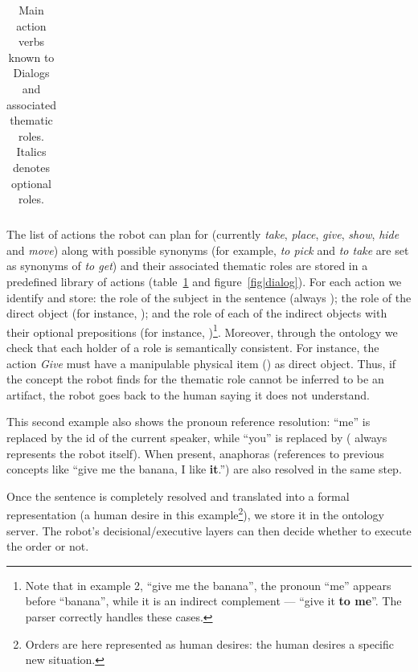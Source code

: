 \begin{table}
\begin{center}
\begin{tabular}{lllll}
\bottomrule

\end{tabular}
\end{center}
\caption{Main action verbs known to {\sc Dialogs} and associated thematic
roles. Italics denotes optional roles.}
\label{table|thematic-roles}
\end{table}

The list of actions the robot can plan for (currently \emph{take},
\emph{place}, \emph{give}, \emph{show}, \emph{hide} and \emph{move}) along with
possible synonyms (for example, \emph{to pick} and \emph{to take} are set as synonyms of \emph{to
get}) and their associated thematic roles are stored in a predefined library
of actions (table~\ref{table|thematic-roles} and figure~\ref{fig|dialog}).
For each action we identify and store: the role of the subject in
the sentence (always ); the role of the direct object (for
instance, ); and the role of each of the indirect objects
with their optional prepositions (for instance,
)\footnote{Note that in example 2, ``give me the banana'',
the pronoun ``me'' appears before ``banana'', while it is an indirect
complement --- ``give it {\bf to me}''. The parser correctly handles these
cases.}. Moreover, through the ontology we check that each holder of a role is
semantically consistent. For instance, the action \emph{Give} must have a
manipulable physical item () as direct object. Thus, if the
concept the robot finds for the thematic role  cannot be
inferred to be an artifact, the robot goes back to the human saying it does not
understand.

This second example  also shows the pronoun reference resolution: ``me'' is
replaced by the id of the current speaker, while ``you'' is replaced by
 ( always represents the robot itself). When
present, anaphoras (references to previous concepts like ``give me the banana,
I like {\bf it}.'') are also resolved in the same step.

Once the sentence is completely resolved and translated into a formal
representation (a human desire in this example\footnote{Orders are here
represented as human desires: the human desires a specific new situation.}), we
store it in the ontology server. The robot's decisional/executive layers can
then decide whether to execute the order or not. 

